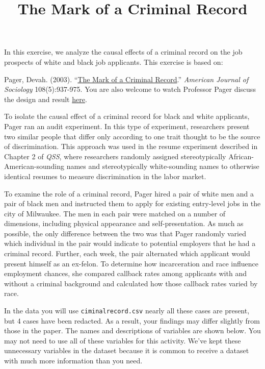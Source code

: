 \documentclass[]{article}
\title{The Mark of a Criminal Record}
\author{}
\date{}
\begin{document}
\maketitle


In this exercise, we analyze the causal effects of a criminal record on
the job prospects of white and black job applicants. This exercise is
based on:

Pager, Devah. (2003). ``\href{https://doi.org/10.1086/374403}{The Mark
of a Criminal Record}.'' \emph{American Journal of Sociology}
108(5):937-975. You are also welcome to watch Professor Pager discuss
the design and result \href{https://youtu.be/nUZqvsF_Wt0}{here}.

To isolate the causal effect of a criminal record for black and white
applicants, Pager ran an audit experiment. In this type of experiment,
researchers present two similar people that differ only according to one
trait thought to be the source of discrimination. This approach was used
in the resume experiment described in Chapter 2 of \emph{QSS}, where
researchers randomly assigned stereotypically African-American-sounding
names and stereotypically white-sounding names to otherwise identical
resumes to measure discrimination in the labor market.

To examine the role of a criminal record, Pager hired a pair of white
men and a pair of black men and instructed them to apply for existing
entry-level jobs in the city of Milwaukee. The men in each pair were
matched on a number of dimensions, including physical appearance and
self-presentation. As much as possible, the only difference between the
two was that Pager randomly varied which individual in the pair would
indicate to potential employers that he had a criminal record. Further,
each week, the pair alternated which applicant would present himself as
an ex-felon. To determine how incarceration and race influence
employment chances, she compared callback rates among applicants with
and without a criminal background and calculated how those callback
rates varied by race.

In the data you will use \texttt{ciminalrecord.csv} nearly all these
cases are present, but 4 cases have been redacted. As a result, your
findings may differ slightly from those in the paper. The names and
descriptions of variables are shown below. You may not need to use all
of these variables for this activity. We've kept these unnecessary
variables in the dataset because it is common to receive a dataset with
much more information than you need.
\end{document}
